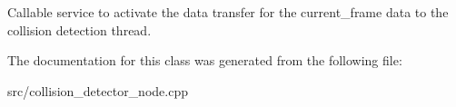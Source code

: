 Callable service to activate the data transfer for the current\+\_\+frame data to the collision detection thread. 

The documentation for this class was generated from the following file\+:\begin{DoxyCompactItemize}
\item 
src/collision\+\_\+detector\+\_\+node.\+cpp\end{DoxyCompactItemize}
